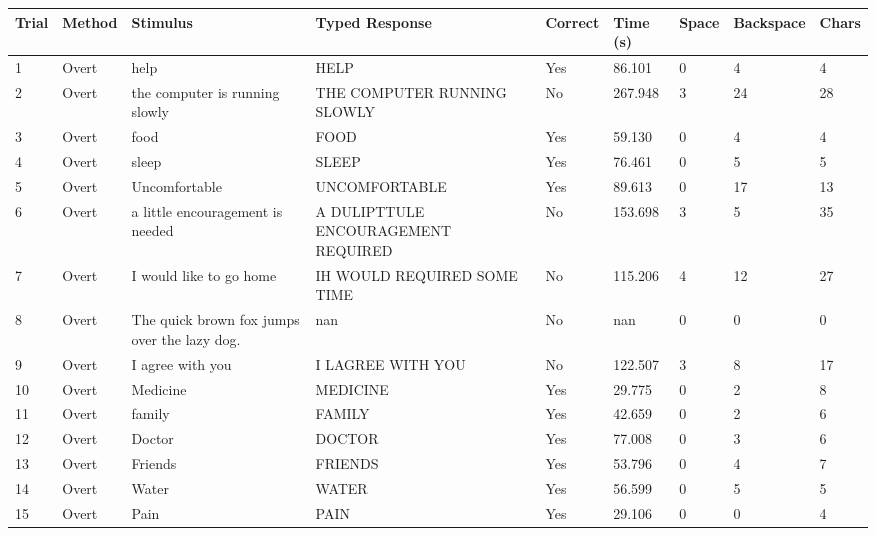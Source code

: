 \documentclass[10pt,a4paper]{article}
\begin{document}
\begin{center}
\begin{tabularx}{\textwidth}{
    C{0.45in}
    C{0.65in}
    L{2.35in}
    L{2.55in}
    C{0.65in}
    C{0.65in}
    C{0.55in}
    C{0.75in}
    C{0.55in}
}
\toprule

\textbf{Trial} &
\textbf{Method} &
\textbf{Stimulus} &
\textbf{Typed Response} &
\textbf{Correct} &
\textbf{Time (s)} &
\textbf{Space} &
\textbf{Backspace} &
\textbf{Chars}
\\

\midrule

1 &
Overt &
help &
HELP &
Yes &
86.101 &
0 &
4 &
4
\\

2 &
Overt &
the computer is running slowly &
THE  COMPUTER RUNNING SLOWLY &
No &
267.948 &
3 &
24 &
28
\\

3 &
Overt &
food &
FOOD &
Yes &
59.130 &
0 &
4 &
4
\\

4 &
Overt &
sleep &
SLEEP &
Yes &
76.461 &
0 &
5 &
5
\\

5 &
Overt &
Uncomfortable &
UNCOMFORTABLE &
Yes &
89.613 &
0 &
17 &
13
\\

6 &
Overt &
a little encouragement is needed &
A DULIPTTULE ENCOURAGEMENT REQUIRED &
No &
153.698 &
3 &
5 &
35
\\

7 &
Overt &
I would like to go home &
IH WOULD REQUIRED SOME TIME &
No &
115.206 &
4 &
12 &
27
\\

8 &
Overt &
The quick brown fox jumps over the lazy dog. &
nan &
No &
nan &
0 &
0 &
0
\\

9 &
Overt &
I agree with you &
I LAGREE WITH YOU &
No &
122.507 &
3 &
8 &
17
\\

10 &
Overt &
Medicine &
MEDICINE &
Yes &
29.775 &
0 &
2 &
8
\\

11 &
Overt &
family &
FAMILY &
Yes &
42.659 &
0 &
2 &
6
\\

12 &
Overt &
Doctor &
DOCTOR &
Yes &
77.008 &
0 &
3 &
6
\\

13 &
Overt &
Friends &
FRIENDS &
Yes &
53.796 &
0 &
4 &
7
\\

14 &
Overt &
Water &
WATER &
Yes &
56.599 &
0 &
5 &
5
\\

15 &
Overt &
Pain &
PAIN &
Yes &
29.106 &
0 &
0 &
4
\\

\bottomrule
\end{tabularx}
\end{center}
\end{document}
